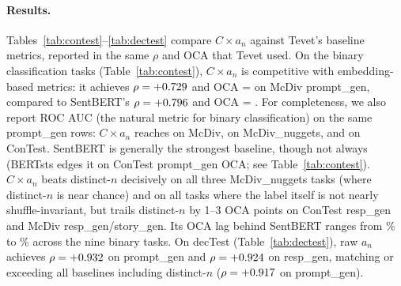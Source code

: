 \paragraph{Results.} Tables~\ref{tab:contest}--\ref{tab:dectest} compare $C \times a_n$ against Tevet's baseline metrics, reported in the same $\rho$ and OCA that Tevet used.
On the binary classification tasks (Table~\ref{tab:contest}), $C \times a_n$ is competitive with embedding-based metrics: it achieves $\rho = +0.729{}$ and OCA = \tevetMcDivPromptGenCxAnOCA{} on McDiv prompt\_gen, compared to SentBERT's $\rho = +0.796{}$ and OCA = \tevetMcDivPromptGenSentBertOCA{}.
For completeness, we also report ROC AUC (the natural metric for binary classification) on the same prompt\_gen rows: $C \times a_n$ reaches \tevetMcDivPromptGenAUC{} on McDiv, \tevetMcDivNugPromptGenCxAnAUC{} on McDiv\_nuggets, and \tevetConTestPromptGenCxAnAUC{} on ConTest.
SentBERT is generally the strongest baseline, though not always (BERTsts edges it on ConTest prompt\_gen OCA; see Table~\ref{tab:contest}). $C \times a_n$ beats distinct-$n$ decisively on all three McDiv\_nuggets tasks (where distinct-$n$ is near chance) and on all tasks where the label itself is not nearly shuffle-invariant, but trails distinct-$n$ by 1--3 OCA points on ConTest resp\_gen and McDiv resp\_gen/story\_gen.
Its OCA lag behind SentBERT ranges from \tevetCxAnVsSentBertOCAMinPct\% to \tevetCxAnVsSentBertOCAMaxPct\% across the nine binary tasks.
On decTest (Table~\ref{tab:dectest}), raw $a_n$ achieves $\rho = +0.932{}$ on prompt\_gen and $\rho = +0.924{}$ on resp\_gen, matching or exceeding all baselines including distinct-$n$ ($\rho = +0.917{}$ on prompt\_gen).

